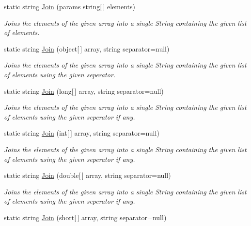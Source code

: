 \begin{DoxyCompactItemize}
static string \hyperlink{class_ultimate_1_1_utilities_1_1_string_utils_af98f11c3d22083dc3a94a093c3a22a2b}{Join} (params string\mbox{[}$\,$\mbox{]} elements)
\begin{DoxyCompactList}\small\item\em Joins the elements of the given array into a single String containing the given list of elements. \end{DoxyCompactList}\item 
static string \hyperlink{class_ultimate_1_1_utilities_1_1_string_utils_a51e3b55eb0a0b7f3beddf46b3e502413}{Join} (object\mbox{[}$\,$\mbox{]} array, string separator=null)
\begin{DoxyCompactList}\small\item\em Joins the elements of the given array into a single String containing the given list of elements using the given seperator. \end{DoxyCompactList}\item 
static string \hyperlink{class_ultimate_1_1_utilities_1_1_string_utils_a261720e60484533dccc7c055401e1ed7}{Join} (long\mbox{[}$\,$\mbox{]} array, string separator=null)
\begin{DoxyCompactList}\small\item\em Joins the elements of the given array into a single String containing the given list of elements using the given seperator if any. \end{DoxyCompactList}\item 
static string \hyperlink{class_ultimate_1_1_utilities_1_1_string_utils_a6b6e11aa0273f89e2d366af6bbbe22b7}{Join} (int\mbox{[}$\,$\mbox{]} array, string separator=null)
\begin{DoxyCompactList}\small\item\em Joins the elements of the given array into a single String containing the given list of elements using the given seperator if any. \end{DoxyCompactList}\item 
static string \hyperlink{class_ultimate_1_1_utilities_1_1_string_utils_add2e75096c3447cca6bcff35052660ed}{Join} (double\mbox{[}$\,$\mbox{]} array, string separator=null)
\begin{DoxyCompactList}\small\item\em Joins the elements of the given array into a single String containing the given list of elements using the given seperator if any. \end{DoxyCompactList}\item 
static string \hyperlink{class_ultimate_1_1_utilities_1_1_string_utils_a15e74e65a4420281d08d9fff71632688}{Join} (short\mbox{[}$\,$\mbox{]} array, string separator=null)

\end{DoxyCompactItemize}
